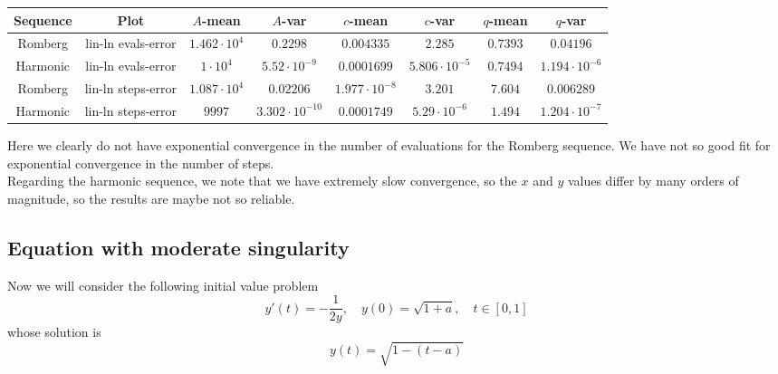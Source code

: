 \begin{table}[H]
    \centering
    \small
     \begin{tabular}{c|c||c|c|c|c|c|c}
Sequence & Plot & \(A\)-mean & \(A\)-var & \(c\)-mean & \(c\)-var & \(q\)-mean & \(q\)-var\\\hline
Romberg & lin-ln evals-error & \(1.462\cdot 10^4\) & \(0.2298\) & \(0.004335\) & \(2.285\) & \(0.7393\) & \(0.04196\) \\
Harmonic & lin-ln evals-error & \(1\cdot 10^4\) & \(5.52\cdot 10^{-9}\) & \(0.0001699\) & \(5.806\cdot 10^{-5}\) & \(0.7494\) & \(1.194\cdot 10^{-6}\) \\
Romberg & lin-ln steps-error & \(1.087\cdot 10^4\) & \(0.02206\) & \(1.977\cdot 10^{-8}\) & \(3.201\) & \(7.604\) & \(0.006289\) \\
Harmonic & lin-ln steps-error & \(9997\) & \(3.302\cdot 10^{-10}\) & \(0.0001749\) & \(5.29\cdot 10^{-6}\) & \(1.494\) & \(1.204\cdot 10^{-7}\) \\
    \end{tabular}
    \label{tab:my_label}
\end{table}

Here we clearly do not have exponential convergence in the number of evaluations for the Romberg sequence. We have not so good fit for exponential convergence in the number of steps.\\

Regarding the harmonic sequence, we note that we have extremely slow convergence, so the \(x\) and \(y\) values differ by many orders of magnitude, so the results are maybe not so reliable.

\subsection{Equation with moderate singularity}

Now we will consider the following initial value problem
\begin{equation}
y'(t) = -\frac{1}{2y}, \quad y(0) = \sqrt{1+a},\quad t\in [0,1]\label{47}
\end{equation}
whose solution is 
\[
y(t) = \sqrt{1 - (t-a)}
\]


